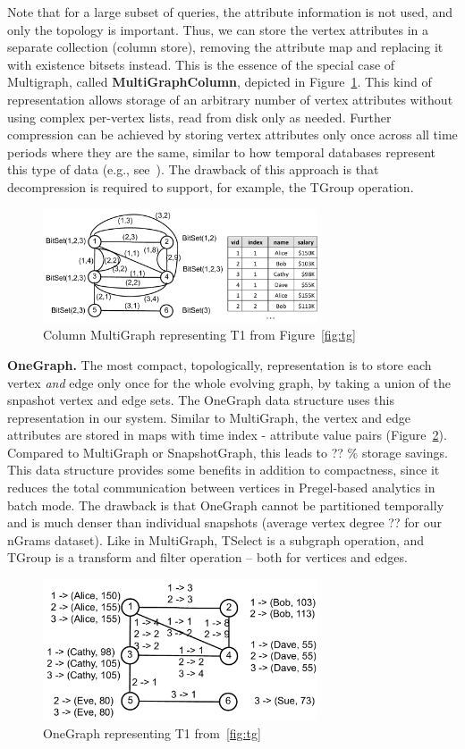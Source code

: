 Note that for a large subset of queries, the attribute information is
not used, and only the topology is important.  Thus, we can store the
vertex attributes in a separate collection (column store), removing
the attribute map and replacing it with existence bitsets instead.
This is the essence of the special case of Multigraph, called {\bf
  MultiGraphColumn}, depicted in Figure~\ref{fig:mgc}.  This kind of
representation allows storage of an arbitrary number of vertex
attributes without using complex per-vertex lists, read from disk only
as needed.  Further compression can be achieved by storing vertex
attributes only once across all time periods where they are the same,
similar to how temporal databases represent this type of data (e.g.,
see~\cite{Muller2008}).  The drawback of this approach is that
decompression is required to support, for example, the TGroup
operation.

\begin{figure}[t!]
\includegraphics[width=3.2in]{figs/mgc.pdf}
\caption{Column MultiGraph representing T1 from Figure~\ref{fig:tg}}
\label{fig:mgc}
\end{figure}

{\bf OneGraph.}  The most compact, topologically, representation is to
store each vertex {\em and} edge only once for the whole evolving
graph, by taking a union of the snpashot vertex and edge sets.  The
OneGraph data structure uses this representation in our system.
Similar to MultiGraph, the vertex and edge attributes are stored in
maps with time index - attribute value pairs (Figure~\ref{fig:og}).
Compared to MultiGraph or SnapshotGraph, this leads to ?? \% storage
savings.  This data structure provides some benefits in addition to
compactness, since it reduces the total communication between vertices
in Pregel-based analytics in batch mode.  The drawback is that
OneGraph cannot be partitioned temporally and is much denser than
individual snapshots (average vertex degree ??  for our nGrams
dataset).  Like in MultiGraph, TSelect is a subgraph operation, and
TGroup is a transform and filter operation -- both for vertices and
edges.

\begin{figure}[t!]
\includegraphics[width=3.2in]{figs/og.pdf}
\caption{OneGraph representing T1 from~\ref{fig:tg}}
\label{fig:og}
\end{figure}

